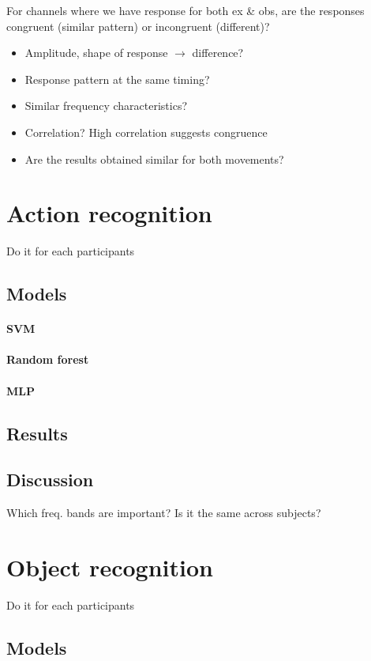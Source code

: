 \documentclass[10pt,conference,compsocconf]{IEEEtran}
\begin{document}
For channels where we have response for both ex \& obs, are the responses congruent (similar pattern) or incongruent (different)?

\begin{itemize}
    \item Amplitude, shape of response \(\to\) difference?
    \item Response pattern at the same timing?
    \item Similar frequency characteristics?
    \item Correlation? High correlation suggests congruence
    \item Are the results obtained similar for both movements?
\end{itemize}


\section{Action recognition}
\label{sec:actionrecognition}
Do it for each participants

\subsection{Models}
\paragraph{SVM}
\paragraph{Random forest}
\paragraph{MLP}
\subsection{Results}
\subsection{Discussion}
Which freq. bands are important? Is it the same across subjects?

\section{Object recognition}
\label{sec:objectrecognition}
Do it for each participants

\subsection{Models}
\end{document}
